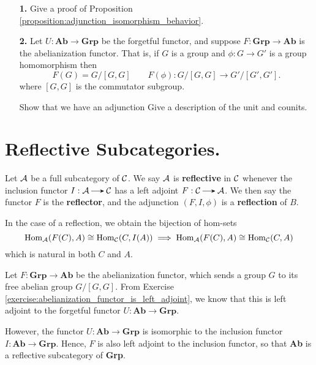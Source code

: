     \begin{itemize}
        \item[\textbf{1.}]
        Give a proof of Proposition \ref{proposition:adjunction_isomorphism_behavior}.  

        \item[\textbf{2.}] 
        Let $U: \textbf{Ab} \to \textbf{Grp}$ be the
        forgetful functor, and suppose $F: \textbf{Grp} \to \textbf{Ab}$ is 
        the abelianization functor. That is, if $G$ is a group and $\phi:
        G \to G'$ is a group homomorphism then 
        \[
            F(G) = G/[G,G] \qquad F(\phi) : G/[G, G] \to G'/[G',G'].
        \]
        where $[G,G]$ is the commutator subgroup.

        Show that we have an adjunction 
        Give a description of the unit and counits. 
    \end{itemize}
    


    
    \newpage
    \section{Reflective Subcategories.} 

    \begin{definition}
        Let $\aa$ be a full subcategory of $\cc$. We say $\aa$ is
        \textbf{reflective} in $\cc$ whenever the inclusion functor
        $I: \aa \to \cc$ has a left adjoint $F: \cc \to \aa$. We then
        say the functor $F$ is the \textbf{reflector}, and the
        adjunction $(F, I, \phi)$ is a \textbf{reflection} of $B$. 
    \end{definition}
    In the case of a reflection, we obtain the bijection of hom-sets 
    \[
        \hom_{\aa}(F(C),A) \cong \hom_{\cc}(C, I(A)) \implies \hom_{\aa}(F(C),A) \cong \hom_{\cc}(C, A) 
    \]
    which is natural in both $C$ and $A$. 


  
    \begin{example}
        Let $F: \textbf{Grp} \to \textbf{Ab}$ be the abelianization functor,
        which sends a group $G$ to its free abelian group $G/[G,G]$.
        From Exercise \ref{exercise:abelianization_functor_is_left_adjoint},
        we know that this is left adjoint to the forgetful functor $U: \textbf{Ab} \to \textbf{Grp}$. 

        However, the functor $U: \textbf{Ab} \to \textbf{Grp}$ is isomorphic to the inclusion 
        functor $I: \textbf{Ab} \to \textbf{Grp}$. Hence, $F$ is also left adjoint 
        to the inclusion functor, so that \textbf{Ab} is a reflective subcategory 
        of \textbf{Grp}. 
    \end{example}

